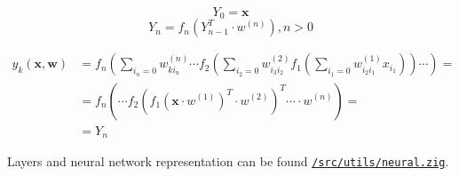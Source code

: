 \documentclass[a4paper,12pt]{article}
\theoremstyle{mytheoremstyle}
\theoremstyle{mytheoremstyle}
\theoremstyle{myproblemstyle}
\begin{document}
    \begin{equation}
        Y_{0} = \textbf{x}
    \end{equation}
    \begin{equation}
        Y_{n} = f_{n} \left( Y_{n - 1}^{T} \cdot w^{(n)} \right), n > 0
    \end{equation}

    \begin{equation}
        \begin{split}
            y_{k}(\mathbf{x}, \mathbf{w}) & = f_{n} \left( \displaystyle\sum_{i_{n}=0} w_{k i_{n}}^{(n)} \cdots f_{2} \left( \displaystyle\sum_{i_{2}=0} w_{i_{3}i_{2}}^{(2)} f_{1} \left( \displaystyle\sum_{i_{1}=0} w_{i_{2}i_{1}}^{(1)}x_{i_{1}} \right) \right) \cdots \right) = \\
            & = f_{n} \left( \cdots f_{2} \left( f_{1} \left( \mathbf{x} \cdot w^{(1)} \right)^{T} \cdot w^{(2)} \right)^{T} \cdots \cdot w^{(n)} \right) = \\
            & = Y_{n}
        \end{split}
        \label{eq:neural_network}
    \end{equation}



    Layers and neural network representation can be found
    \href{run:../src/utils/neural.zig}{\texttt{/src/utils/neural.zig}}.


    \medskip

    \printbibliography[
    heading=bibintoc
    ]
\end{document}
